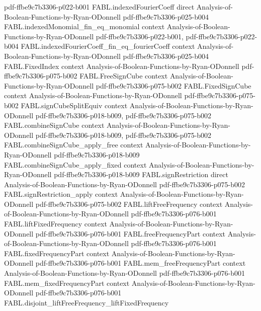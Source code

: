 \begin{theorem}
  {pdf-ffbe9c7b3306-p022-b001}
\proofstep
  {FABL.indexedFourierCoeff}
  {direct}
  {Analysis-of-Boolean-Functions-by-Ryan-ODonnell}
  {pdf-ffbe9c7b3306-p025-b004}
\proofstep
  {FABL.indexedMonomial_fin_eq_monomial}
  {context}
  {Analysis-of-Boolean-Functions-by-Ryan-ODonnell}
  {pdf-ffbe9c7b3306-p022-b001,
    pdf-ffbe9c7b3306-p022-b004}
\proofstep
  {FABL.indexedFourierCoeff_fin_eq_fourierCoeff}
  {context}
  {Analysis-of-Boolean-Functions-by-Ryan-ODonnell}
  {pdf-ffbe9c7b3306-p025-b004}
\proofstep
  {FABL.FixedIndex}
  {context}
  {Analysis-of-Boolean-Functions-by-Ryan-ODonnell}
  {pdf-ffbe9c7b3306-p075-b002}
\proofstep
  {FABL.FreeSignCube}
  {context}
  {Analysis-of-Boolean-Functions-by-Ryan-ODonnell}
  {pdf-ffbe9c7b3306-p075-b002}
\proofstep
  {FABL.FixedSignCube}
  {context}
  {Analysis-of-Boolean-Functions-by-Ryan-ODonnell}
  {pdf-ffbe9c7b3306-p075-b002}
\proofstep
  {FABL.signCubeSplitEquiv}
  {context}
  {Analysis-of-Boolean-Functions-by-Ryan-ODonnell}
  {pdf-ffbe9c7b3306-p018-b009,
    pdf-ffbe9c7b3306-p075-b002}
\proofstep
  {FABL.combineSignCube}
  {context}
  {Analysis-of-Boolean-Functions-by-Ryan-ODonnell}
  {pdf-ffbe9c7b3306-p018-b009,
    pdf-ffbe9c7b3306-p075-b002}
\proofstep
  {FABL.combineSignCube_apply_free}
  {context}
  {Analysis-of-Boolean-Functions-by-Ryan-ODonnell}
  {pdf-ffbe9c7b3306-p018-b009}
\proofstep
  {FABL.combineSignCube_apply_fixed}
  {context}
  {Analysis-of-Boolean-Functions-by-Ryan-ODonnell}
  {pdf-ffbe9c7b3306-p018-b009}
\proofstep
  {FABL.signRestriction}
  {direct}
  {Analysis-of-Boolean-Functions-by-Ryan-ODonnell}
  {pdf-ffbe9c7b3306-p075-b002}
\proofstep
  {FABL.signRestriction_apply}
  {context}
  {Analysis-of-Boolean-Functions-by-Ryan-ODonnell}
  {pdf-ffbe9c7b3306-p075-b002}
\proofstep
  {FABL.liftFreeFrequency}
  {context}
  {Analysis-of-Boolean-Functions-by-Ryan-ODonnell}
  {pdf-ffbe9c7b3306-p076-b001}
\proofstep
  {FABL.liftFixedFrequency}
  {context}
  {Analysis-of-Boolean-Functions-by-Ryan-ODonnell}
  {pdf-ffbe9c7b3306-p076-b001}
\proofstep
  {FABL.freeFrequencyPart}
  {context}
  {Analysis-of-Boolean-Functions-by-Ryan-ODonnell}
  {pdf-ffbe9c7b3306-p076-b001}
\proofstep
  {FABL.fixedFrequencyPart}
  {context}
  {Analysis-of-Boolean-Functions-by-Ryan-ODonnell}
  {pdf-ffbe9c7b3306-p076-b001}
\proofstep
  {FABL.mem_freeFrequencyPart}
  {context}
  {Analysis-of-Boolean-Functions-by-Ryan-ODonnell}
  {pdf-ffbe9c7b3306-p076-b001}
\proofstep
  {FABL.mem_fixedFrequencyPart}
  {context}
  {Analysis-of-Boolean-Functions-by-Ryan-ODonnell}
  {pdf-ffbe9c7b3306-p076-b001}
\proofstep
  {FABL.disjoint_liftFreeFrequency_liftFixedFrequency}

\end{theorem}
